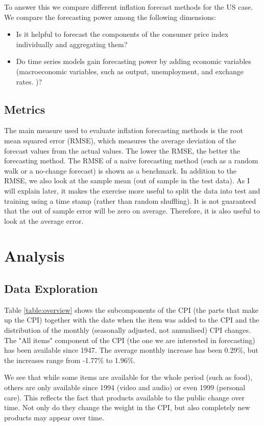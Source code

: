 \documentclass[12pt]{article}
\begin{document}
To answer this we compare different inflation forecast methods for the US case. We compare the forecasting power among the following dimensions: 
\begin{itemize}
\item Is it helpful to forecast the components of the consumer price index individually and aggregating them?
\item Do time series models gain forecasting power by adding economic variables (macroeconomic variables, such as output, unemployment, and exchange rates. )?
\end{itemize}

\subsection{Metrics}
The main measure used to evaluate inflation forecasting methods is the root mean squared error (RMSE), which measures the average deviation of the forecast values from the actual values. The lower the RMSE, the better the forecasting method.
The RMSE of a naive forecasting method (such as a random walk or a no-change forecast) is shown as a benchmark.
In addition to the RMSE, we also look at the sample mean (out of sample in the test data). As I will explain later, it makes the exercise more useful to split the data into test and training using a time stamp (rather than random shuffling). It is not guaranteed that the out of sample error will be zero on average. Therefore, it is also useful to look at the average error.

\section{Analysis}
\subsection{Data Exploration}

Table \ref{table:overview} shows the subcomponents of the CPI (the parts that make up the CPI) together with the date when the item was added to the CPI and the distribution of the monthly (seasonally adjusted, not annualised) CPI changes. 
The "All items" component of the CPI (the one we are interested in forecasting) has been available since 1947. The average monthly increase has been 0.29\%, but the increases range from -1.77\% to 1.96\%.

We see that while some items are available for the whole period (such as food), others are only available since 1994 (video and audio) or even 1999 (personal care). This reflects the fact that products available to the public change over time. Not only do they change the weight in the CPI, but also completely new products may appear over time. 
\end{document}
